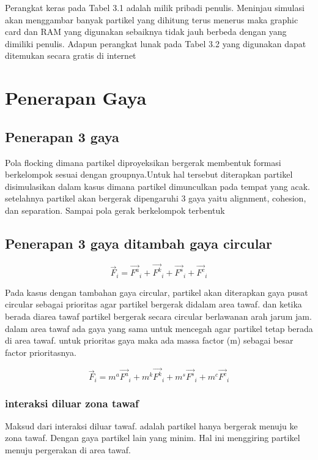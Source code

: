 \hspace{0.6cm}Perangkat keras pada Tabel 3.1 adalah milik pribadi penulis. Meninjau simulasi
akan menggambar banyak partikel yang dihitung terus menerus maka graphic card dan RAM yang digunakan sebaiknya tidak jauh berbeda dengan yang dimiliki
penulis. Adapun perangkat lunak pada Tabel 3.2 yang digunakan dapat ditemukan
secara gratis di internet



\section{Penerapan Gaya}

\subsection{Penerapan 3 gaya}
\hspace{0.6cm}Pola flocking dimana partikel diproyeksikan bergerak membentuk formasi berkelompok sesuai dengan groupnya.Untuk hal tersebut diterapkan partikel disimulasikan dalam kasus dimana partikel dimunculkan pada tempat yang acak. setelahnya partikel akan bergerak dipengaruhi 3 gaya yaitu alignment, cohesion, dan separation. Sampai pola gerak berkelompok terbentuk

\subsection{Penerapan 3 gaya ditambah gaya circular}

\begin{equation}
\vec{F}_i = \vec{F^a}_i + \vec{F^k}_i + \vec{F^s}_i + \vec{F^c}_i
\end{equation}

\hspace{0.6cm}Pada kasus dengan tambahan gaya circular, partikel akan diterapkan gaya pusat circular sebagai prioritas agar partikel bergerak didalam area tawaf. dan ketika berada diarea tawaf partikel bergerak secara circular berlawanan arah jarum jam. dalam area tawaf ada gaya yang sama untuk mencegah agar partikel tetap berada di area tawaf.
untuk prioritas gaya maka ada massa factor (m) sebagai besar factor prioritasnya.

\begin{equation}
\vec{F}_i = m^a\vec{F^a}_i + m^k\vec{F^k}_i + m^s\vec{F^s}_i + m^c\vec{F^c}_i
\end{equation}

\subsubsection{interaksi diluar zona tawaf}
\hspace{0.6cm} Maksud dari interaksi diluar tawaf. adalah partikel hanya bergerak menuju ke zona tawaf. Dengan gaya partikel lain yang minim. Hal ini menggiring partikel menuju pergerakan di area tawaf.

